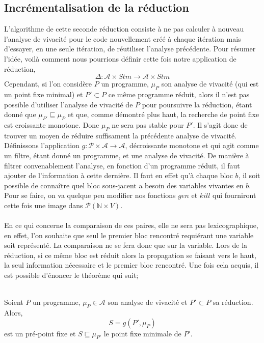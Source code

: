 \documentclass[a4paper, 12pt]{article}
\begin{document}
\subsection{Incrémentalisation de la réduction}
L'algorithme de cette seconde réduction consiste à ne pas calculer à nouveau l'analyse de vivacité pour le
code nouvellement créé à chaque itération mais d'essayer, en une seule itération, de réutiliser l'analyse précédente.
Pour résumer l'idée, voilà comment nous pourrions définir cette fois notre application de réduction,
\[\Delta : \mathcal{A} \times Stm \longrightarrow \mathcal{A} \times Stm \]
Cependant, si l'on considère $P$ un programme, $\mu_P$ son analyse de vivacité (qui est un point fixe minimal) et $P' \subset P$ ce même programme
réduit, alors il n'est pas possible d'utiliser l'analyse de vivacité de $P$ pour poursuivre la réduction, étant donné que
$\mu_{P'} \sqsubseteq \mu_P$ et que, comme démontré plus haut, la recherche de point fixe est croissante monotone. Donc
$\mu_P$ ne sera pas stable pour $P'$. Il s'agit donc de trouver un moyen de réduire suffisament la précédente analyse de vivacité.
Définissons l'application $g : \mathcal{P} \times \mathcal{A} \longrightarrow \mathcal{A}$, décroissante monotone et qui agit comme
un filtre, étant donné un programme, et une analyse de vivacité. De manière à filtrer convenablement l'analyse, en fonction d'un programme
réduit, il faut ajouter de l'information à cette dernière. Il faut en effet qu'à chaque bloc $b$, il soit possible de connaître quel bloc sous-jacent
a besoin des variables vivantes en $b$. Pour se faire, on va quelque peu modifier nos fonctions $gen$ et $kill$ qui fourniront cette fois une image dans
$\mathcal{P}(\mathbb{N} \times V)$. 
\\
\\
En ce qui concerne la comparaison de ces paires, elle ne sera pas lexicographique, en effet, l'on souhaite que seul le premier bloc rencontré requiérant
une variable soit représenté. La comparaison ne se fera donc que sur la variable. Lors de la réduction, si ce même bloc est réduit alors la propagation se faisant vers le haut, la seul information nécessaire
et le premier bloc rencontré. Une fois cela acquis, il est possible d'énoncer le théorème qui suit;
\\
\\
\begin{theorem}
	Soient $P$ un programme, $\mu_P \in \mathcal{A}$ son analyse de vivacité et $P' \subset P$ sa réduction.
	Alors,
	\[S = g(P', \mu_P)\]
	est un pré-point fixe et $S \sqsubseteq \mu_{P'}$ le point fixe minimale de $P'$.
\end{theorem}
\end{document}
